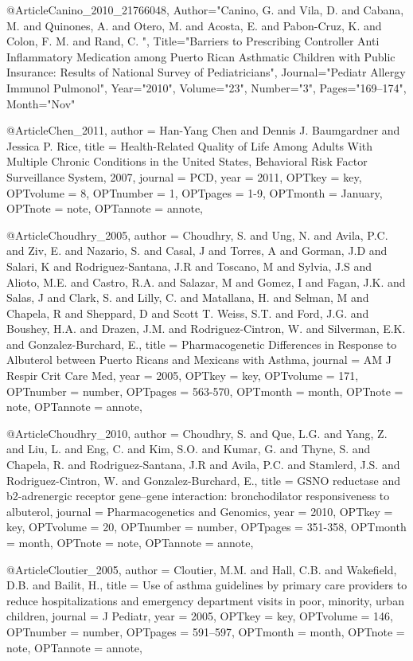 {{%
@Article{Canino_2010_21766048,
   Author="Canino, G.  and Vila, D.  and Cabana, M.  and Quinones, A.  and Otero, M.  and Acosta, E.  and Pabon-Cruz, K.  and Colon, F. M.  and Rand, C. ",
   Title="{{B}arriers to {P}rescribing {C}ontroller {A}nti {I}nflammatory {M}edication among {P}uerto {R}ican {A}sthmatic {C}hildren with {P}ublic {I}nsurance: {R}esults of {N}ational {S}urvey of {P}ediatricians}",
   Journal="Pediatr Allergy Immunol Pulmonol",
   Year="2010",
   Volume="23",
   Number="3",
   Pages="169--174",
   Month="Nov"
}


@Article{Chen_2011,
author = {Han-Yang Chen and Dennis J. Baumgardner and Jessica P. Rice},
title = {Health-Related Quality of Life Among Adults With Multiple Chronic Conditions in the United States, Behavioral Risk Factor Surveillance System, 2007},
journal = {PCD},
year = {2011},
OPTkey = {key},
OPTvolume = {8},
OPTnumber = {1},
OPTpages = {1-9},
OPTmonth = {January},
OPTnote = {note},
OPTannote = {annote},
}


@Article{Choudhry_2005,
author = {Choudhry, S. and Ung, N.  and Avila, P.C.  and Ziv, E. and Nazario, S.  and Casal, J  and Torres, A and Gorman, J.D and Salari, K  and Rodriguez-Santana, J.R  and Toscano, M  and Sylvia, J.S and Alioto, M.E.  and Castro, R.A.  and Salazar, M and Gomez, I  and Fagan, J.K. and Salas, J and Clark, S. and Lilly, C. and Matallana, H. and Selman, M and Chapela, R and Sheppard, D and Scott T. Weiss, S.T. and Ford, J.G. and Boushey, H.A. and Drazen, J.M. and Rodriguez-Cintron, W. and Silverman, E.K. and  Gonzalez-Burchard, E.},
title = {Pharmacogenetic Differences in Response to Albuterol between Puerto Ricans and Mexicans with Asthma},
journal = {AM J Respir Crit Care Med},
year = {2005},
OPTkey = {key},
OPTvolume = {171},
OPTnumber = {number},
OPTpages = {563-570},
OPTmonth = {month},
OPTnote = {note},
OPTannote = {annote},
}

@Article{Choudhry_2010,
author = {Choudhry, S. and Que, L.G. and Yang, Z. and Liu, L. and Eng, C. and Kim, S.O. and Kumar, G. and Thyne, S. and Chapela, R. and 
Rodriguez-Santana, J.R  and Avila, P.C. and Stamlerd, J.S. and Rodriguez-Cintron, W. and  Gonzalez-Burchard, E.},
title = {GSNO reductase and b2-adrenergic receptor gene–gene interaction: bronchodilator responsiveness to albuterol},
journal = {Pharmacogenetics and Genomics},
year = {2010},
OPTkey = {key},
OPTvolume = {20},
OPTnumber = {number},
OPTpages = {351-358},
OPTmonth = {month},
OPTnote = {note},
OPTannote = {annote},
}

@Article{Cloutier_2005,
author = {Cloutier, M.M. and Hall, C.B. and Wakefield, D.B. and Bailit, H.},
title = {Use of asthma guidelines by
primary care providers to reduce
hospitalizations and emergency department
visits in poor, minority,
urban children},
journal = {J Pediatr},
year = {2005},
OPTkey = {key},
OPTvolume = {146},
OPTnumber = {number},
OPTpages = {591–597},
OPTmonth = {month},
OPTnote = {note},
OPTannote = {annote},
}

}}
